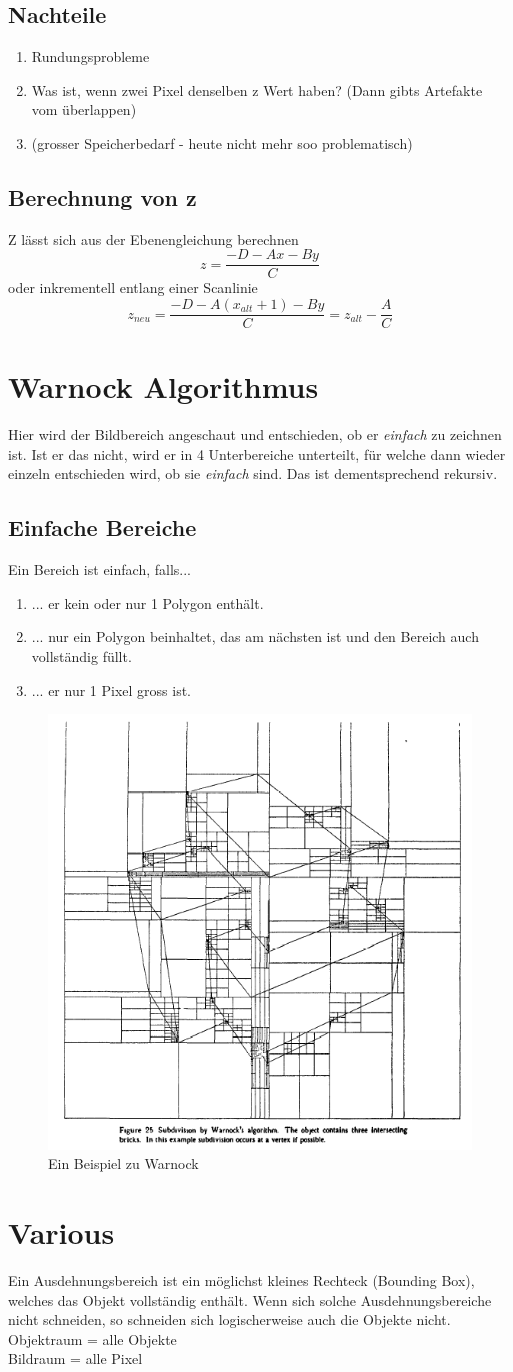 \subsection{Nachteile}
\begin{enumerate}
	\item Rundungsprobleme
	\item Was ist, wenn zwei Pixel denselben z Wert haben? (Dann gibts Artefakte vom überlappen)
	\item (grosser Speicherbedarf - heute nicht mehr soo problematisch)
\end{enumerate}
\subsection{Berechnung von z}
Z lässt sich aus der Ebenengleichung berechnen
\begin{displaymath}
z = \frac{-D-Ax-By}{C}
\end{displaymath}
oder inkrementell entlang einer Scanlinie
\begin{displaymath}
z_{neu} = \frac{-D-A(x_{alt}+1)-By}{C}=z_{alt}-\frac{A}{C}
\end{displaymath}


\section{Warnock Algorithmus}
Hier wird der Bildbereich angeschaut und entschieden, ob er \textit{einfach} zu zeichnen ist. Ist er das nicht, wird er in 4 Unterbereiche unterteilt, für welche dann wieder einzeln entschieden wird, ob sie \textit{einfach} sind. Das ist dementsprechend rekursiv.
\subsection{Einfache Bereiche}
Ein Bereich ist einfach, falls...
\begin{enumerate}
	\item ... er kein oder nur 1 Polygon enthält.
	\item ... nur ein Polygon beinhaltet, das am nächsten ist und den Bereich auch vollständig füllt.
	\item ... er nur 1 Pixel gross ist.
\end{enumerate}
\begin{figure}[!ht]
	\centering
	\includegraphics[width=0.4\linewidth]{fig/warnock}
	\caption{Ein Beispiel zu Warnock}
	\label{fig:warnock}
\end{figure}
\section{Various}
Ein Ausdehnungsbereich ist ein möglichst kleines Rechteck (Bounding Box), welches das Objekt vollständig enthält. Wenn sich solche Ausdehnungsbereiche nicht schneiden, so schneiden sich logischerweise auch die Objekte nicht.\\
Objektraum = alle Objekte\\
Bildraum = alle Pixel